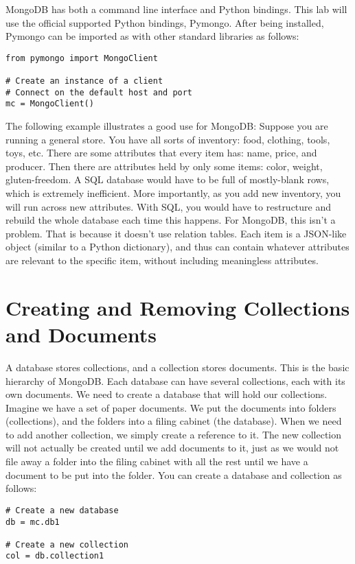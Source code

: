 MongoDB has both a command line interface and Python bindings.  This lab will use the official supported Python bindings, Pymongo.  After being installed, Pymongo can be imported as with other standard libraries as follows: 
 
\begin{lstlisting}
from pymongo import MongoClient

# Create an instance of a client
# Connect on the default host and port
mc = MongoClient()
\end{lstlisting}

The following example illustrates a good use for MongoDB: Suppose you are running a general store.  You have all sorts of inventory: food, clothing, tools, toys, etc.  There are some attributes that every item has: name, price, and producer.  Then there are attributes held by only some items: color, weight, gluten-freedom.  A SQL database would have to be full of mostly-blank rows, which is extremely inefficient.  More importantly, as you add new inventory, you will run across new attributes.  With SQL, you would have to restructure and rebuild the whole database each time this happens.  For MongoDB, this isn't a problem.  That is because it doesn't use relation tables.  Each item is a JSON-like object (similar to a Python dictionary), and thus can contain whatever attributes are relevant to the specific item, without including meaningless attributes.


\section*{Creating and Removing Collections and Documents}
A database stores collections, and a collection stores documents.  This is the basic hierarchy of MongoDB.  Each database can have several collections, each with its own documents.  We need to create a database that will hold our collections.  Imagine we have a set of paper documents.  We put the documents into folders (collections), and the folders into a filing cabinet (the database).  When we need to add another collection, we simply create a reference to it.  The new collection will not actually be created until we add documents to it, just as we would not file away a folder into the filing cabinet with all the rest until we have a document to be put into the folder.  You can create a database and collection as follows:

\begin{lstlisting}
# Create a new database
db = mc.db1

# Create a new collection
col = db.collection1
\end{lstlisting}

